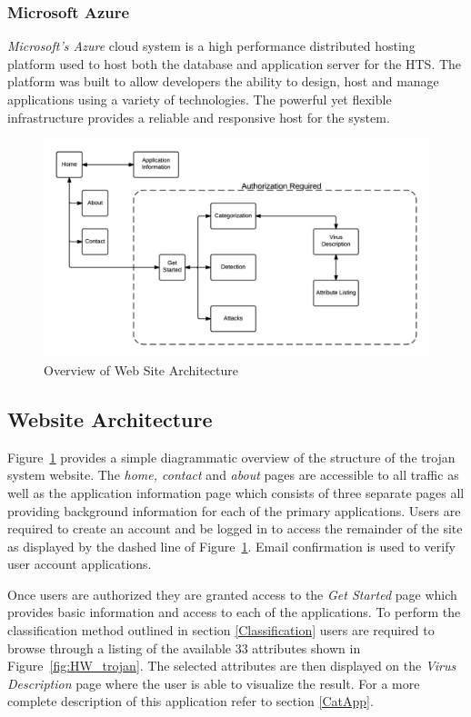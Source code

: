 \subsubsection{Microsoft Azure}
\textit{Microsoft's Azure} cloud system is a high performance distributed hosting platform used to host both the database and application server for the HTS. The platform was built to allow developers the ability to design, host and manage applications using a variety of technologies. The powerful yet flexible infrastructure provides a reliable and responsive host for the system.
\begin{figure}
	\centering
	\includegraphics[width=1\linewidth]{figures/WebsiteArchitecture}
	\caption[Overview of Web Site Architecture]{Overview of Web Site Architecture}
	\label{fig:WebsiteArchitecture}
\end{figure}
\subsection{Website Architecture}
Figure~\ref{fig:WebsiteArchitecture} provides a simple diagrammatic overview of the structure of the trojan system website. The \textit{home, contact} and \textit{about} pages are accessible to all traffic as well as the application information page which consists of three separate pages all providing background information for each of the primary applications. Users are required to create an account and be logged in to access the remainder of the site as displayed by the dashed line of Figure~\ref{fig:WebsiteArchitecture}. Email confirmation is used to verify user account applications. 

Once users are authorized they are granted access to the \textit{Get Started} page which provides basic information and access to each of the applications. To perform the classification method outlined in section \ref{Classification} users are required to browse through a listing of the available 33 attributes shown in Figure~\ref{fig:HW_trojan}. The selected attributes are then displayed on the \textit{Virus Description} page where the user is able to visualize the result. For a more complete description of this application refer to section \ref{CatApp}.

